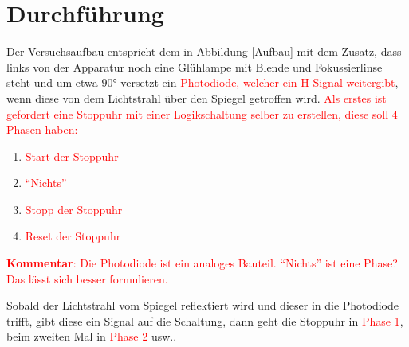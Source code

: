     
  \section{Durchführung}
    
    Der Versuchsaufbau entspricht dem in Abbildung \ref{Aufbau} mit dem Zusatz, dass links von der Apparatur 
    noch eine Glühlampe mit Blende und Fokussierlinse steht und um etwa 90° versetzt ein 
    \textcolor{red}{Photodiode, welcher ein H-Signal weitergibt}, wenn diese von dem Lichtstrahl über den Spiegel 
    getroffen wird.
   \textcolor{red}{Als erstes ist gefordert eine Stoppuhr mit einer Logikschaltung selber zu erstellen, diese soll 4 
    Phasen haben:}
    
    \begin{enumerate}
      \item{\textcolor{red}{Start der Stoppuhr}} 
      \item{\textcolor{red}{\enquote{Nichts}}} 
      \item{\textcolor{red}{Stopp der Stoppuhr}} 
      \item{\textcolor{red}{Reset der Stoppuhr} }
    \end{enumerate}
    \textcolor{red}{\textbf{Kommentar}: Die Photodiode ist ein analoges Bauteil. \enquote{Nichts} ist eine Phase? Das lässt sich besser formulieren.}
    
    Sobald der Lichtstrahl vom Spiegel reflektiert wird und dieser in die Photodiode trifft, gibt 
    diese ein Signal auf die Schaltung, dann geht die Stoppuhr in \textcolor{red}{Phase 1}, beim zweiten Mal in 
    \textcolor{red}{Phase 2} usw..
  
